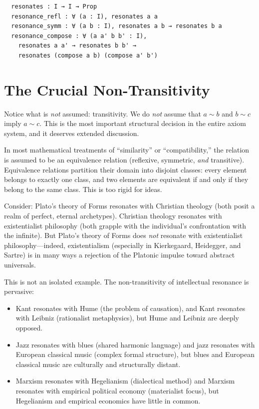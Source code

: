 \documentclass[11pt,openany]{book}
\theoremstyle{definition}
\theoremstyle{plain}
\theoremstyle{remark}
\newcommand{\res}{\sim}                      %
\begin{document}
\begin{lstlisting}
  resonates : I → I → Prop
  resonance_refl : ∀ (a : I), resonates a a
  resonance_symm : ∀ (a b : I), resonates a b → resonates b a
  resonance_compose : ∀ (a a' b b' : I),
    resonates a a' → resonates b b' → 
    resonates (compose a b) (compose a' b')
\end{lstlisting}

\section{The Crucial Non-Transitivity}

Notice what is \emph{not} assumed: transitivity. We do \emph{not} assume that $a \res b$ and $b \res c$ imply $a \res c$. This is the most important structural decision in the entire axiom system, and it deserves extended discussion.

In most mathematical treatments of ``similarity'' or ``compatibility,'' the relation is assumed to be an equivalence relation (reflexive, symmetric, \emph{and} transitive). Equivalence relations partition their domain into disjoint classes: every element belongs to exactly one class, and two elements are equivalent if and only if they belong to the same class. This is too rigid for ideas.

Consider: Plato's theory of Forms resonates with Christian theology (both posit a realm of perfect, eternal archetypes). Christian theology resonates with existentialist philosophy (both grapple with the individual's confrontation with the infinite). But Plato's theory of Forms does \emph{not} resonate with existentialist philosophy---indeed, existentialism (especially in Kierkegaard, Heidegger, and Sartre) is in many ways a rejection of the Platonic impulse toward abstract universals.

This is not an isolated example. The non-transitivity of intellectual resonance is pervasive:
\begin{itemize}
\item Kant resonates with Hume (the problem of causation), and Kant resonates with Leibniz (rationalist metaphysics), but Hume and Leibniz are deeply opposed.
\item Jazz resonates with blues (shared harmonic language) and jazz resonates with European classical music (complex formal structure), but blues and European classical music are culturally and structurally distant.
\item Marxism resonates with Hegelianism (dialectical method) and Marxism resonates with empirical political economy (materialist focus), but Hegelianism and empirical economics have little in common.
\end{itemize}
\end{document}
